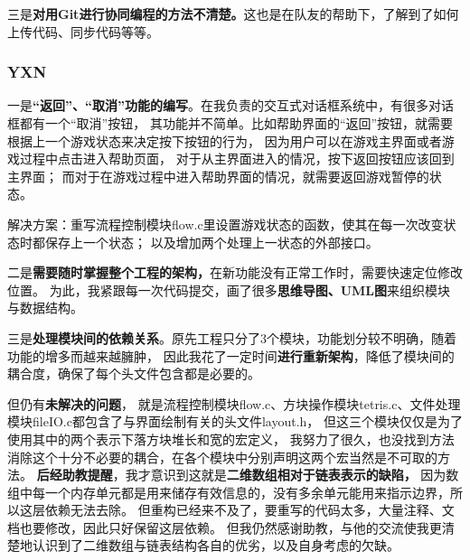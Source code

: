 \documentclass{style/ucasproposal}
\begin{document}
三是\textbf{对用Git进行协同编程的方法不清楚。}这也是在队友的帮助下，了解到了如何上传代码、同步代码等等。


\subsubsection{YXN}

一是\textbf{“返回”、“取消”功能的编写}。在我负责的交互式对话框系统中，有很多对话框都有一个“取消”按钮，
其功能并不简单。比如帮助界面的“返回”按钮，就需要根据上一个游戏状态来决定按下按钮的行为，
因为用户可以在游戏主界面或者游戏过程中点击进入帮助页面，
对于从主界面进入的情况，按下返回按钮应该回到主界面；
而对于在游戏过程中进入帮助界面的情况，就需要返回游戏暂停的状态。

解决方案：重写流程控制模块flow.c里设置游戏状态的函数，使其在每一次改变状态时都保存上一个状态；
以及增加两个处理上一状态的外部接口。

二是\textbf{需要随时掌握整个工程的架构，}在新功能没有正常工作时，需要快速定位修改位置。
为此，我紧跟每一次代码提交，画了很多\textbf{思维导图、UML图}来组织模块与数据结构。

三是\textbf{处理模块间的依赖关系}。原先工程只分了3个模块，功能划分较不明确，随着功能的增多而越来越臃肿，
因此我花了一定时间\textbf{进行重新架构}，降低了模块间的耦合度，确保了每个头文件包含都是必要的。

但仍有\textbf{未解决的问题}，
就是流程控制模块flow.c、方块操作模块tetris.c、文件处理模块fileIO.c都包含了与界面绘制有关的头文件layout.h，
但这三个模块仅仅是为了使用其中的两个表示下落方块堆长和宽的宏定义，
我努力了很久，也没找到方法消除这个十分不必要的耦合，在各个模块中分别声明这两个宏当然是不可取的方法。
\textbf{后经助教提醒}，我才意识到这就是\textbf{二维数组相对于链表表示的缺陷，}
因为数组中每一个内存单元都是用来储存有效信息的，没有多余单元能用来指示边界，所以这层依赖无法去除。
但重构已经来不及了，要重写的代码太多，大量注释、文档也要修改，因此只好保留这层依赖。
但我仍然感谢助教，与他的交流使我更清楚地认识到了二维数组与链表结构各自的优劣，以及自身考虑的欠缺。


\end{document}

